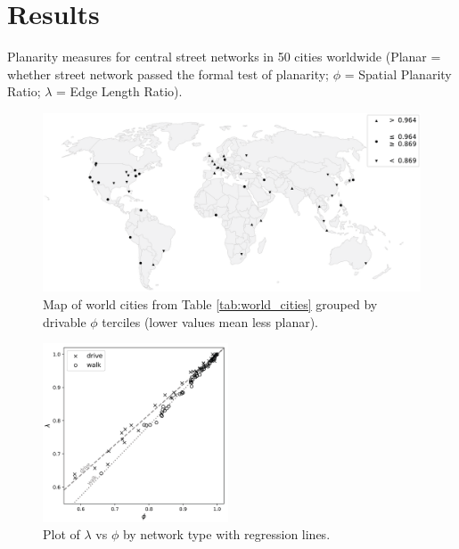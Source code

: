 \documentclass[Afour,sageh,times]{sagej}
\begin{document}
\section{Results}

\begin{table}[htbp]
	\centering
	\caption{Planarity measures for central street networks in 50 cities worldwide (Planar = whether street network passed the formal test of planarity; $\phi$ = Spatial Planarity Ratio; $\lambda$ = Edge Length Ratio).}
	\label{tab:world_cities}
	
\end{table}

\begin{figure}[htbp]
	\centering
	\includegraphics[width=\textwidth]{figures_tables/world_map_bw.png}
	\caption{Map of world cities from Table \ref{tab:world_cities} grouped by drivable $\phi$ terciles (lower values mean less planar).}
	\label{fig:world_map_bw}
\end{figure}

\begin{figure}[htbp]
	\centering
	\includegraphics[width=0.49\textwidth]{figures_tables/regression_lambda_phi_linear.png}
	\caption{Plot of $\lambda$ vs $\phi$ by network type with regression lines.}
	\label{fig:regression_lambda_phi}
\end{figure}
\end{document}
